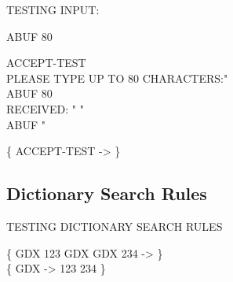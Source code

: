 \begin{tt}
TESTING INPUT: 

 ABUF 80  

\word{:} ACCEPT-TEST \\
\tab {}  PLEASE TYPE UP TO 80 CHARACTERS:"  \\
\tab ABUF 80  \\
\tab {}  RECEIVED: " \word{[CHAR]} "  \\
\tab ABUF   \word{[CHAR]} "   \\
\word{;}

\{ ACCEPT-TEST -> \}
\end{tt}

\subsection{Dictionary Search Rules}

\begin{tt}
TESTING DICTIONARY SEARCH RULES

\{ \word{:} GDX   123 \word{;} \tab \word{:} GDX   GDX 234 \word{;} -> \} \\
\{ GDX -> 123 234 \}

\end{tt}
